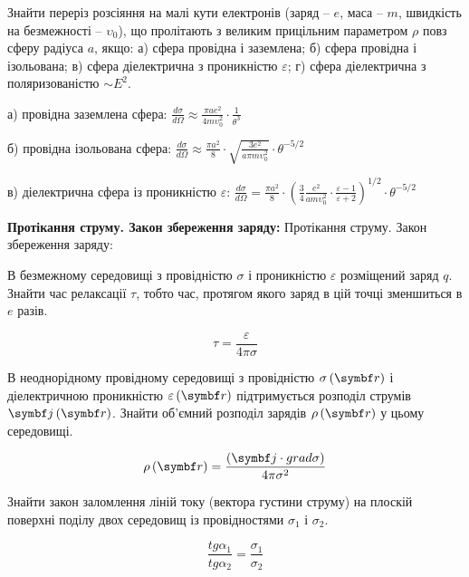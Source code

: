 \documentclass[]{ProblemBook}
\begin{document}
\begin{problem}
 Знайти переріз розсіяння на малі кути електронів (заряд – $e$, маса – $m$, швидкість на безмежності – $υ_0$), що пролітають з великим прицільним параметром $\rho$ повз сферу радіуса $a$, якщо: а) сфера провідна і заземлена; б) сфера провідна і ізольована; в) сфера діелектрична з проникністю $\varepsilon$; г) сфера діелектрична з поляризованістю $\sim E^2$.  
	\begin{solution}
	
а) провідна заземлена сфера: $\frac{d\sigma}{d\Omega} \approx \frac{\pi ae^2}{4mυ_0^2} \cdot \frac{1}{\theta ^3}$

б) провідна ізольована сфера: $\frac{d\sigma}{d\Omega} \approx \frac{\pi a^2}{8} \cdot \sqrt {\frac{3e^2}{a\pi mυ_0^2}}\cdot\theta ^{-5/2}$

в) діелектрична сфера із проникністю $\varepsilon$: $\frac{d\sigma }{d\Omega} = \frac{\pi a^2}{8} \cdot \left( \frac{3}{4}\frac{e^2}{am\upsilon _0^2} \cdot \frac{\varepsilon  - 1}{\varepsilon  + 2} \right)^{1/2} \cdot \theta ^{-5/2}$
\end{solution}
\end{problem}

{\bf {Протікання струму. Закон збереження заряду:}}
Протікання струму. Закон збереження заряду:
\begin{problem}
 В безмежному середовищі з провідністю $\sigma$ і проникністю $\varepsilon$  розміщений заряд $q$. Знайти час релаксації $\tau$, тобто час, протягом якого заряд в цій точці зменшиться в $e$ разів. 
	\begin{solution}
	\[\tau  = \frac{\varepsilon }{4\pi \sigma }\]
\end{solution}
\end{problem}

\begin{problem}
 В неоднорідному провідному середовищі з провідністю $\sigma\left(\vect{r}\right)$ і діелектричною проникністю $\varepsilon\left(\vect{r}\right)$   підтримується розподіл струмів $\vect{j}\left(\vect{r}\right)$. Знайти об’ємний розподіл зарядів $\rho\left(\vect{r}\right)$ у цьому середовищі.
	\begin{solution}
	\[\rho \left( \vect {r} \right) = \frac{\left( {\vect {j} \cdot grad\sigma } \right)}{4\pi \sigma^2}\]
\end{solution}
\end{problem}

\begin{problem}
 Знайти закон заломлення ліній току (вектора густини струму) на плоскій поверхні поділу двох середовищ із провідностями $\sigma_{1}$ і $\sigma_{2}$.
	\begin{solution}
\[\frac{tg\alpha_1}{tg\alpha _2} = \frac{\sigma _1}{\sigma _2}\]	
\end{solution}
\end{problem}
\end{document}
